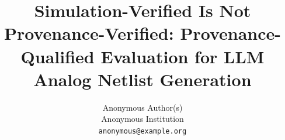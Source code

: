 \newcommand{\artifacturl}{\texttt{<ANONYMISED ARTIFACT URL: REPLACE BEFORE SUBMITTING>}}

\title{Simulation-Verified Is Not Provenance-Verified: Provenance-Qualified
  Evaluation for LLM Analog Netlist Generation}

\author{%
  Anonymous Author(s) \\
  Anonymous Institution \\
  \texttt{anonymous@example.org}
}



